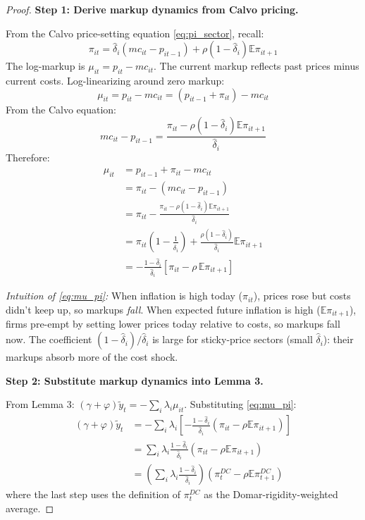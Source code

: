 \documentclass[12pt]{article}
\begin{document}
\begin{proof}

\textbf{Step 1: Derive markup dynamics from Calvo pricing.}

From the Calvo price-setting equation \eqref{eq:pi_sector}, recall:
\begin{equation}
    \pi_{it} = \hat{\delta}_i(mc_{it} - p_{it-1}) + \rho(1-\hat{\delta}_i)\mathbb{E}\pi_{it+1}
\end{equation}
The log-markup is $\mu_{it} = p_{it} - mc_{it}$. The current markup reflects past prices minus current costs. Log-linearizing around zero markup:
\begin{equation}
    \mu_{it} = p_{it} - mc_{it} = (p_{it-1} + \pi_{it}) - mc_{it}
\end{equation}
From the Calvo equation:
\begin{equation}
    mc_{it} - p_{it-1} = \frac{\pi_{it} - \rho(1-\hat{\delta}_i)\mathbb{E}\pi_{it+1}}{\hat{\delta}_i}
\end{equation}
Therefore:
\begin{align}
    \mu_{it} &= p_{it-1} + \pi_{it} - mc_{it} \nonumber \\
    &= \pi_{it} - (mc_{it} - p_{it-1}) \nonumber \\
    &= \pi_{it} - \frac{\pi_{it} - \rho(1-\hat{\delta}_i)\mathbb{E}\pi_{it+1}}{\hat{\delta}_i} \nonumber \\
    &= \pi_{it}\left(1 - \frac{1}{\hat{\delta}_i}\right) + \frac{\rho(1-\hat{\delta}_i)}{\hat{\delta}_i}\mathbb{E}\pi_{it+1} \nonumber \\
    &= -\frac{1-\hat{\delta}_i}{\hat{\delta}_i}\left[\pi_{it} - \rho\,\mathbb{E}\pi_{it+1}\right]
    \label{eq:mu_pi}
\end{align}

\textit{Intuition of \eqref{eq:mu_pi}:} When inflation is high today ($\pi_{it}$), prices rose but costs didn't keep up, so markups \textit{fall}. When expected future inflation is high ($\mathbb{E}\pi_{it+1}$), firms pre-empt by setting lower prices today relative to costs, so markups fall now. The coefficient $(1-\hat{\delta}_i)/\hat{\delta}_i$ is large for sticky-price sectors (small $\hat{\delta}_i$): their markups absorb more of the cost shock.

\medskip
\textbf{Step 2: Substitute markup dynamics into Lemma 3.}

From Lemma 3: $(\gamma+\varphi)\tilde{y}_t = -\sum_i \lambda_i \mu_{it}$. Substituting \eqref{eq:mu_pi}:
\begin{align}
    (\gamma+\varphi)\tilde{y}_t &= -\sum_i \lambda_i \left[-\frac{1-\hat{\delta}_i}{\hat{\delta}_i}(\pi_{it} - \rho\mathbb{E}\pi_{it+1})\right] \nonumber \\
    &= \sum_i \lambda_i \frac{1-\hat{\delta}_i}{\hat{\delta}_i} (\pi_{it} - \rho\mathbb{E}\pi_{it+1}) \nonumber \\
    &= \left(\sum_i \lambda_i \frac{1-\hat{\delta}_i}{\hat{\delta}_i}\right) (\pi_t^{DC} - \rho\mathbb{E}\pi_{t+1}^{DC})
    \label{eq:DCderivation}
\end{align}
where the last step uses the definition of $\pi_t^{DC}$ as the Domar-rigidity-weighted average.


\end{proof}
\end{document}
